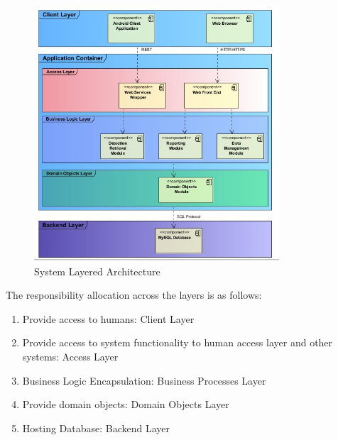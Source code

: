 \documentclass[12pt]{article}
\makeatletter
\renewcommand{\subsection}{\@startsection
   {subsection}%
   {2}%
   {4mm}%
   {-0.75\baselineskip}%
   {0.25\baselineskip}%
   {\rmfamily\normalfont\scshape\normalsize}}%
\makeatother
\begin{document}
                			
                			\begin{figure}[h]
                                   \centering
                                   \includegraphics[width=3.59in, height=3.75in]{Pictures/SystemArchitectureLayers.jpg}
                                   \caption{System Layered Architecture}
        					\end{figure}
        					\FloatBarrier
                			
                			
                			The responsibility allocation across the layers is as follows:
                			\begin{enumerate}
                					\item Provide access to humans: Client Layer
                					\item Provide access to system functionality to human access layer and other systems: Access Layer
                					\item Business Logic Encapsulation: Business Processes Layer
                					\item Provide domain objects: Domain Objects Layer
                					\item Hosting Database: Backend Layer
                			\end{enumerate}
                			
\end{document}
